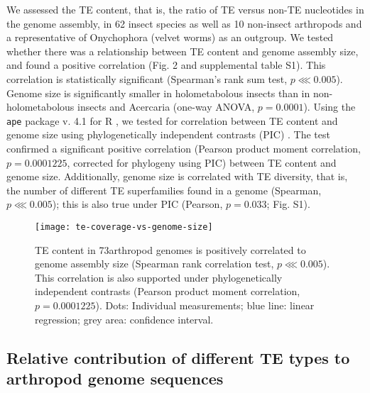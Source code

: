 We assessed the TE content, that is, the ratio of TE versus non-TE
nucleotides in the genome assembly, in 62 insect species as well as 10
non-insect arthropods and a representative of Onychophora (velvet worms)
as an outgroup. We tested whether there was a relationship between TE
content and genome assembly size, and found a positive correlation (Fig.
2 and supplemental table S1). This correlation is statistically
significant (Spearman's rank sum test, \(p \lll 0.005\)). Genome size is
significantly smaller in holometabolous insects than in
non-holometabolous insects and Acercaria (one-way ANOVA,
\(p = 0.0001\)). Using the \texttt{ape} package v. 4.1
\citep{Paradis2004} for R \citep{RCoreTeam2017}, we tested for correlation
between TE content and genome size using phylogenetically independent
contrasts (PIC) \citep{Felsenstein1985}. The test confirmed a significant
positive correlation (Pearson product moment correlation,
\(p = 0.0001225\), corrected for phylogeny using PIC) between TE content
and genome size. Additionally, genome size is correlated with TE
diversity, that is, the number of different TE superfamilies found in a
genome (Spearman, \(p \lll 0.005\)); this is also true under PIC
(Pearson, \(p = 0.033\); Fig. S1).

\begin{figure}[h!]
\begin{center}
\texttt{[image: te-coverage-vs-genome-size]}
\caption[TE content is positively correlated to genome size]{{TE content
in 73arthropod genomes is positively correlated to genome assembly size
(Spearman rank correlation test, \(p \lll 0.005\)). This correlation is
also supported under phylogenetically independent contrasts
\protect\citep{Felsenstein1985} (Pearson product moment correlation, \(p
= 0.0001225\)). Dots: Individual measurements; blue line: linear
regression; grey area: confidence interval.%
}}
\end{center}
\end{figure}

\subsection{Relative contribution of different TE types to arthropod
genome
sequences}\label{relative-contribution-of-different-te-types-to-arthropod-genome-sequences}

